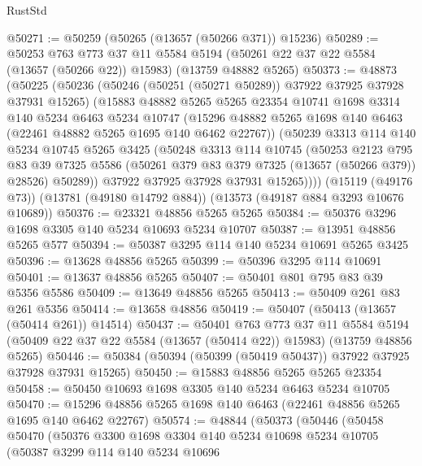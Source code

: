 \begin{lexlean}{RustStd}
\begin{coremodule}
@50271 := @50259 (@50265 (@13657 (@50266 @371)) @15236)
@50289 := @50253
    @763
    @773
    @37
    @11
    @5584
    @5194
    (@50261 @22 @37 @22 @5584 (@13657 (@50266 @22)) @15983)
    (@13759 @48882 @5265)
@50373 := @48873
    (@50225
      (@50236
        (@50246 (@50251 (@50271 @50289)) @37922 @37925 @37928 @37931 @15265)
        (@15883
          @48882
          @5265
          @5265
          @23354
          @10741
          @1698
          @3314
          @140
          @5234
          @6463
          @5234
          @10747
          (@15296 @48882 @5265 @1698 @140 @6463 (@22461 @48882 @5265 @1695 @140 @6462 @22767))
          (@50239
            @3313
            @114
            @140
            @5234
            @10745
            @5265
            @3425
            (@50248
              @3313
              @114
              @10745
              (@50253
                @2123
                @795
                @83
                @39
                @7325
                @5586
                (@50261 @379 @83 @379 @7325 (@13657 (@50266 @379)) @28526)
                @50289))
            @37922
            @37925
            @37928
            @37931
            @15265))))
    (@15119 (@49176 @73))
    (@13781 (@49180 @14792 @884))
    (@13573 (@49187 @884 @3293 @10676 @10689))
@50376 := @23321 @48856 @5265 @5265
@50384 := @50376 @3296 @1698 @3305 @140 @5234 @10693 @5234 @10707
@50387 := @13951 @48856 @5265 @577
@50394 := @50387 @3295 @114 @140 @5234 @10691 @5265 @3425
@50396 := @13628 @48856 @5265
@50399 := @50396 @3295 @114 @10691
@50401 := @13637 @48856 @5265
@50407 := @50401 @801 @795 @83 @39 @5356 @5586
@50409 := @13649 @48856 @5265
@50413 := @50409 @261 @83 @261 @5356
@50414 := @13658 @48856
@50419 := @50407 (@50413 (@13657 (@50414 @261)) @14514)
@50437 := @50401
    @763
    @773
    @37
    @11
    @5584
    @5194
    (@50409 @22 @37 @22 @5584 (@13657 (@50414 @22)) @15983)
    (@13759 @48856 @5265)
@50446 := @50384 (@50394 (@50399 (@50419 @50437)) @37922 @37925 @37928 @37931 @15265)
@50450 := @15883 @48856 @5265 @5265 @23354
@50458 := @50450 @10693 @1698 @3305 @140 @5234 @6463 @5234 @10705
@50470 := @15296 @48856 @5265 @1698 @140 @6463 (@22461 @48856 @5265 @1695 @140 @6462 @22767)
@50574 := @48844
    (@50373
      (@50446
        (@50458
          @50470
          (@50376
            @3300
            @1698
            @3304
            @140
            @5234
            @10698
            @5234
            @10705
            (@50387
              @3299
              @114
              @140
              @5234
              @10696

\end{coremodule}
\end{lexlean}
